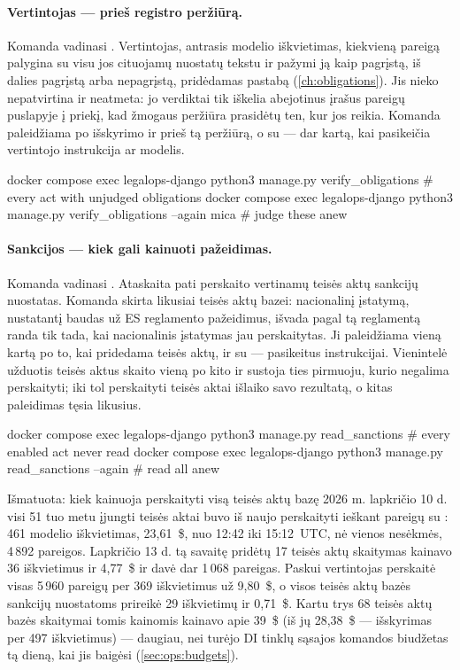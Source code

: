 \paragraph{Vertintojas --- prieš registro peržiūrą.} Komanda vadinasi .
Vertintojas, antrasis modelio iškvietimas, kiekvieną pareigą palygina su visu jos cituojamų
nuostatų tekstu ir pažymi ją kaip pagrįstą, iš dalies pagrįstą arba nepagrįstą, pridėdamas pastabą
(\cref{ch:obligations}). Jis nieko nepatvirtina ir neatmeta: jo verdiktai tik iškelia abejotinus
įrašus pareigų puslapyje į priekį, kad žmogaus peržiūra prasidėtų ten, kur jos reikia. Komanda
paleidžiama po išskyrimo ir prieš tą peržiūrą, o su  --- dar kartą, kai pasikeičia
vertintojo instrukcija ar modelis.

\begin{codeblock}
docker compose exec legalops-django python3 manage.py verify_obligations             # every act with unjudged obligations
docker compose exec legalops-django python3 manage.py verify_obligations --again mica  # judge these anew
\end{codeblock}

\paragraph{Sankcijos --- kiek gali kainuoti pažeidimas.} Komanda vadinasi .
Ataskaita pati perskaito vertinamų teisės aktų sankcijų nuostatas. Komanda skirta likusiai teisės
aktų bazei: nacionalinį įstatymą, nustatantį baudas už ES reglamento pažeidimus, išvada pagal tą
reglamentą randa tik tada, kai nacionalinis įstatymas jau perskaitytas. Ji paleidžiama vieną kartą
po to, kai pridedama teisės aktų, ir su  --- pasikeitus instrukcijai. Vienintelė
užduotis teisės aktus skaito vieną po kito ir sustoja ties pirmuoju, kurio negalima perskaityti;
iki tol perskaityti teisės aktai išlaiko savo rezultatą, o kitas paleidimas tęsia likusius.

\begin{codeblock}
docker compose exec legalops-django python3 manage.py read_sanctions           # every enabled act never read
docker compose exec legalops-django python3 manage.py read_sanctions --again   # read all anew
\end{codeblock}

\begin{lessonbox}{Išmatuota: kiek kainuoja perskaityti visą teisės aktų bazę}
2026 m. lapkričio 10 d. visi 51 tuo metu įjungti teisės aktai buvo iš naujo perskaityti ieškant
pareigų su : 461 modelio iškvietimas, 23,61~\$, nuo 12:42 iki 15:12~UTC, nė
vienos nesėkmės, 4\,892 pareigos. Lapkričio 13 d. tą savaitę pridėtų 17 teisės aktų skaitymas kainavo
36 iškvietimus ir 4,77~\$ ir davė dar 1\,068 pareigas. Paskui vertintojas perskaitė visas
5\,960 pareigų per 369 iškvietimus už 9,80~\$, o visos teisės aktų bazės sankcijų nuostatoms
prireikė 29 iškvietimų ir 0,71~\$. Kartu trys 68 teisės aktų bazės skaitymai tomis kainomis
kainavo apie 39~\$ (iš jų 28,38~\$ --- išskyrimas per 497 iškvietimus) --- daugiau, nei turėjo DI
tinklų sąsajos komandos biudžetas tą dieną, kai jis
baigėsi (\cref{sec:ops:budgets}).
\end{lessonbox}

